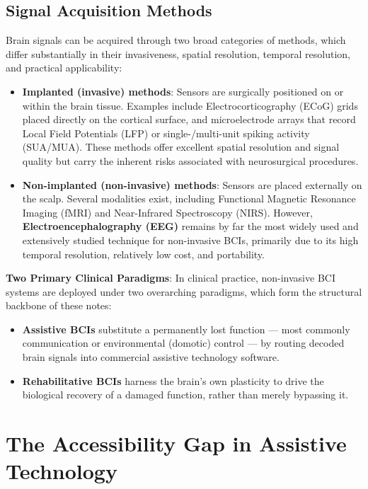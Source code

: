 \documentclass[10pt, letterpaper]{report}
\begin{document}
\subsection{Signal Acquisition Methods}

Brain signals can be acquired through two broad categories of methods, which differ
substantially in their invasiveness, spatial resolution, temporal resolution, and practical
applicability:

\begin{itemize}
  \item \textbf{Implanted (invasive) methods}: Sensors are surgically positioned on or
  within the brain tissue. Examples include Electrocorticography (ECoG) grids placed
  directly on the cortical surface, and microelectrode arrays that record Local Field
  Potentials (LFP) or single-/multi-unit spiking activity (SUA/MUA). These methods
  offer excellent spatial resolution and signal quality but carry the inherent risks
  associated with neurosurgical procedures.

  \item \textbf{Non-implanted (non-invasive) methods}: Sensors are placed externally on
  the scalp. Several modalities exist, including Functional Magnetic Resonance Imaging
  (fMRI) and Near-Infrared Spectroscopy (NIRS). However, \textbf{Electroencephalography
  (EEG)} remains by far the most widely used and extensively studied technique for
  non-invasive BCIs, primarily due to its high temporal resolution, relatively low cost,
  and portability.
\end{itemize}

\textbf{Two Primary Clinical Paradigms}: In clinical practice, non-invasive BCI systems are deployed under two overarching
paradigms, which form the structural backbone of these notes:

\begin{itemize}
  \item \textbf{Assistive BCIs} substitute a permanently lost function — most commonly
  communication or environmental (domotic) control — by routing decoded brain signals
  into commercial assistive technology software.

  \item \textbf{Rehabilitative BCIs} harness the brain's own plasticity to drive the
  biological recovery of a damaged function, rather than merely bypassing it.
\end{itemize}

\section{The Accessibility Gap in Assistive Technology}
\end{document}

